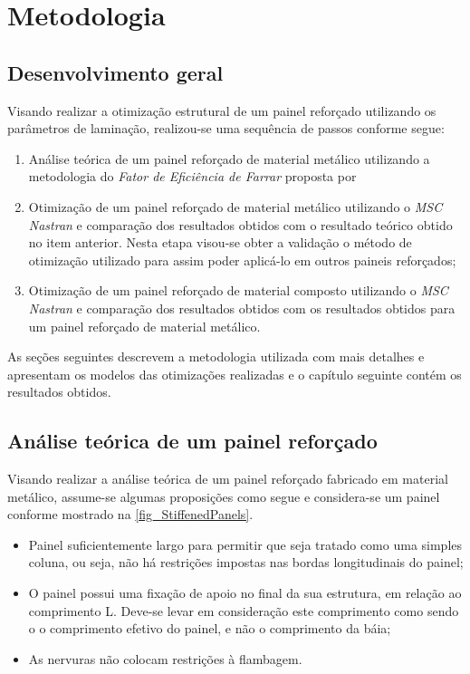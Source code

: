  \chapter[Metodologia]{Metodologia}

 \section{Desenvolvimento geral}
Visando realizar a otimização estrutural de um painel reforçado utilizando os parâmetros de laminação, realizou-se uma sequência de passos conforme segue:
\begin{enumerate}
  \item Análise teórica de um painel reforçado de material metálico utilizando a metodologia do \emph{Fator de Eficiência de Farrar} proposta por \cite{niu1997airframe}
  \item Otimização de um painel reforçado de material metálico utilizando o \emph{MSC Nastran} e comparação dos resultados obtidos com o resultado teórico obtido no item anterior. Nesta etapa visou-se obter a validação o método de otimização utilizado para assim poder aplicá-lo em outros paineis reforçados;
  \item Otimização de um painel reforçado de material composto utilizando o \emph{MSC Nastran} e comparação dos resultados obtidos com os resultados obtidos para um painel reforçado de material metálico.
\end {enumerate}

As seções seguintes descrevem a metodologia utilizada com mais detalhes e apresentam os modelos das otimizações realizadas e o capítulo seguinte contém os resultados obtidos.

\section{Análise teórica de um painel reforçado}
Visando realizar a análise teórica de um painel reforçado fabricado em material metálico, assume-se algumas proposições como segue e considera-se um painel conforme mostrado na \autoref{fig_StiffenedPanels}.

\begin{itemize}
\item Painel suficientemente largo para permitir que seja tratado como uma simples coluna, ou seja, não há restrições impostas nas bordas longitudinais do painel;
\item O painel possui uma fixação de apoio no final da sua estrutura, em relação ao comprimento L. Deve-se levar em consideração este comprimento como sendo o o comprimento efetivo do painel, e não o comprimento da báia;
\item As nervuras não colocam restrições à flambagem.
\end{itemize}


